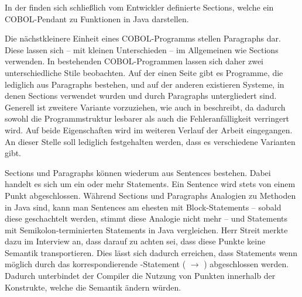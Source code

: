In der  finden sich schließlich vom Entwickler definierte Sections, welche ein COBOL-Pendant zu Funktionen in Java darstellen.

Die nächstkleinere Einheit eines COBOL-Programms stellen Paragraphs dar. Diese lassen sich -- mit kleinen Unterschieden -- im Allgemeinen wie Sections verwenden. In bestehenden COBOL-Programmen lassen sich daher zwei unterschiedliche Stile beobachten. Auf der einen Seite gibt es Programme, die lediglich aus Paragraphs bestehen, und auf der anderen existieren Systeme, in denen Sections verwendet wurden und durch Paragraphs untergliedert sind. Generell ist zweitere Variante vorzuziehen, wie auch \citeauthor{richards_enhancing_1984} in  beschreibt, da dadurch sowohl die Programmstruktur lesbarer als auch die Fehleranfälligkeit verringert wird. Auf beide Eigenschaften wird im weiteren Verlauf der Arbeit eingegangen. An dieser Stelle soll lediglich festgehalten werden, dass es verschiedene Varianten gibt.

Sections und Paragraphs können wiederum aus Sentences bestehen. Dabei handelt es sich um ein oder mehr Statements. Ein Sentence wird stets von einem Punkt abgeschlossen. Während Sections und Paragraphs Analogien zu Methoden in Java sind, kann man Sentences am ehesten mit Block-Statements -- sobald diese geschachtelt werden, stimmt diese Analogie nicht mehr -- und Statements mit Semikolon-terminierten Statements in Java vergleichen. Herr Streit merkte dazu im Interview an, dass darauf zu achten sei, dass diese Punkte keine Semantik transportieren. Dies lässt sich dadurch erreichen, dass Statements wenn möglich durch das korrespondierende -Statement (\zB {} $\rightarrow$ ) abgeschlossen werden. Dadurch unterbindet der Compiler die Nutzung von Punkten innerhalb der Konstrukte, welche die Semantik ändern würden.

